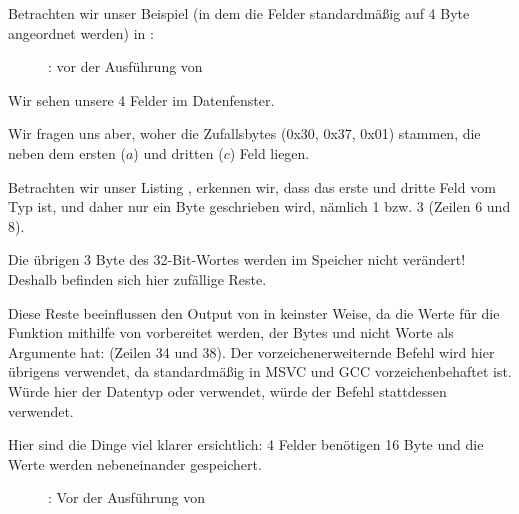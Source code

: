 \clearpage
{}
\myindex{\olly}
Betrachten wir unser Beispiel (in dem die Felder standardmäßig auf 4 Byte angeordnet werden) in \olly:

\begin{figure}[H]
\centering
{}
\caption{\olly: vor der Ausführung von \printf}
\label{fig:packing_olly_4}
\end{figure}
Wir sehen unsere 4 Felder im Datenfenster.

Wir fragen uns aber, woher die Zufallsbytes (0x30, 0x37, 0x01) stammen, die neben dem ersten ($a$) und dritten ($c$)
Feld liegen.

Betrachten wir unser Listing , erkennen wir, dass das erste und dritte Feld vom Typ \Tchar
ist, und daher nur ein Byte geschrieben wird, nämlich 1 bzw. 3 (Zeilen 6 und 8).

Die übrigen 3 Byte des 32-Bit-Wortes werden im Speicher nicht verändert!
Deshalb befinden sich hier zufällige Reste.

Diese Reste beeinflussen den Output von \printf in keinster Weise, da die Werte für die Funktion mithilfe von \MOVSX
vorbereitet werden, der Bytes und nicht Worte als Argumente hat: 
 (Zeilen 34 und 38).
Der vorzeichenerweiternde Befehl \MOVSX wird hier übrigens verwendet, da \Tchar standardmäßig in MSVC und GCC
vorzeichenbehaftet ist.
Würde hier der Datentyp  oder  verwendet, würde der Befehl \MOVZX stattdessen verwendet.

\clearpage
{}
\myindex{\olly}
Hier sind die Dinge viel klarer ersichtlich: 4 Felder benötigen 16 Byte und die Werte werden nebeneinander gespeichert.

\begin{figure}[H]
\centering
{}
\caption{\olly: Vor der Ausführung von \printf}
\label{fig:packing_olly_1}
\end{figure}
